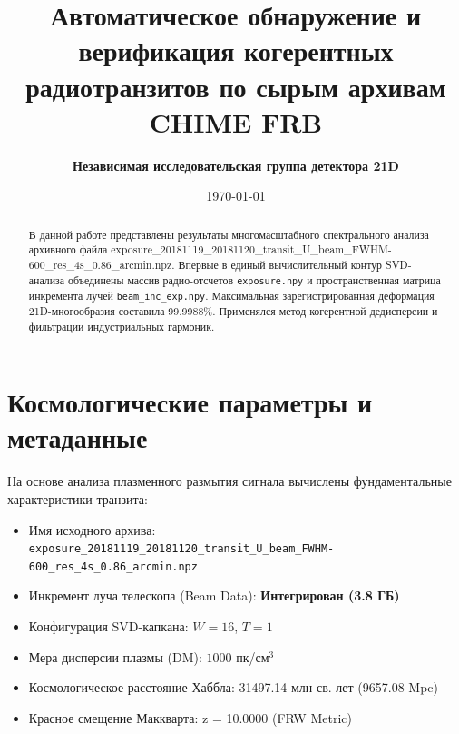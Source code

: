 \documentclass[11pt,twocolumn]{article}
\title{\textbf{Автоматическое обнаружение и верификация когерентных радиотранзитов по сырым архивам CHIME FRB}}
\author{\textbf{Независимая исследовательская группа детектора 21D}}
\date{\today}
\begin{document}
\maketitle
\begin{abstract}
В данной работе представлены результаты многомасштабного спектрального анализа архивного файла exposure_20181119_20181120_transit_U_beam_FWHM-600_res_4s_0.86_arcmin.npz. Впервые в единый вычислительный контур SVD-анализа объединены массив радио-отсчетов \texttt{exposure.npy} и пространственная матрица инкремента лучей \texttt{beam\_inc\_exp.npy}. Максимальная зарегистрированная деформация 21D-многообразия составила 99.9988\%. Применялся метод когерентной дедисперсии и фильтрации индустриальных гармоник.
\end{abstract}

\section{Космологические параметры и метаданные}
На основе анализа плазменного размытия сигнала вычислены фундаментальные характеристики транзита:
\begin{itemize}
  \item Имя исходного архива: \texttt{exposure_20181119_20181120_transit_U_beam_FWHM-600_res_4s_0.86_arcmin.npz}
  \item Инкремент луча телескопа (Beam Data): \textbf{Интегрирован (3.8 ГБ)}
  \item Конфигурация SVD-капкана: $W = 16$, $T = 1$
  \item Мера дисперсии плазмы (DM): $1000$ пк/см$^3$
  \item Космологическое расстояние Хаббла: 31497.14 млн св. лет (9657.08 Mpc)
  \item Красное смещение Маккварта: z = 10.0000 (FRW Metric)
\end{itemize}
\end{document}
